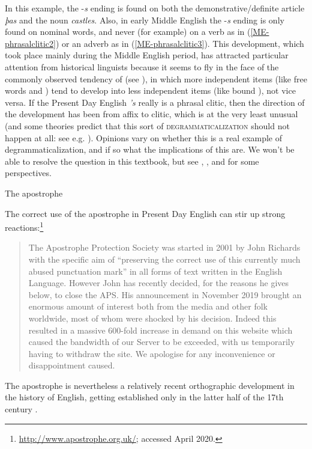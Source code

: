 \noindent In this example, the -\emph{s} ending is found on both the demonstrative/definite article \emph{þas} and the noun \emph{castles}. Also, in early Middle English the -\emph{s} ending is only found on nominal words, and never (for example) on a verb as in (\ref{ME-phrasalclitic2}) or an adverb as in (\ref{ME-phrasalclitic3}). This development, which took place mainly during the Middle English period, has attracted particular attention from historical linguists because it seems to fly in the face of the commonly observed tendency of  (see ), in which more independent items (like free words and ) tend to develop into less independent items (like bound ), not vice versa. If the Present Day English \emph{'s} really is a phrasal clitic, then the direction of the development has been from affix to clitic, which is at the very least unusual (and some theories predict that this sort of \textsc{degrammaticalization} should not happen at all: see e.g. \citealp[22]{Lehmann2015}). Opinions vary on whether this is a real example of degrammaticalization, and if so what the implications of this are. We won't be able to resolve the question in this textbook, but see \citet{Allen2008}, \citet{Norde2009}, \citet{Szmrescanyi2013} and \citet{Rosenbach2014} for some perspectives.


\begin{sourcebox}{The apostrophe}

The correct use of the apostrophe in Present Day English can stir up strong reactions:\footnote{\url{http://www.apostrophe.org.uk/}; accessed April 2020.}
\begin{quotation}
  The Apostrophe Protection Society was started in 2001 by John Richards with the specific aim of ``preserving the correct use of this currently much abused punctuation mark'' in all forms of text written in the English Language. However John has recently decided, for the reasons he gives below, to close the APS. His announcement in November 2019 brought an enormous amount of interest both from the media and other folk worldwide, most of whom were shocked by his decision.  Indeed this resulted in a massive 600-fold increase in demand on this website which caused the bandwidth of our Server to be exceeded, with us temporarily having to withdraw the site. We apologise for any inconvenience or disappointment caused.
 \end{quotation}
The apostrophe is nevertheless a relatively recent orthographic development in the history of English, getting established only in the latter half of the 17th century \citep[74]{Nevalainen2006}.
\end{sourcebox}



